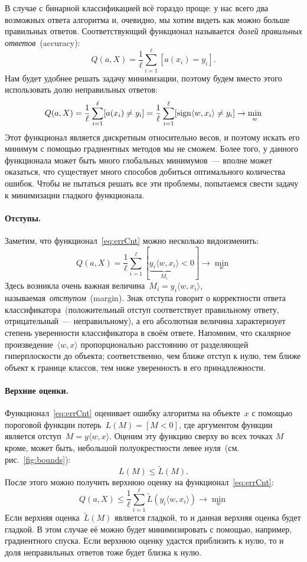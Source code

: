 \documentclass[12pt,fleqn]{article}
\begin{document}
В случае с бинарной классификацией всё гораздо проще: у нас всего два возможных ответа алгоритма и,
очевидно, мы хотим видеть как можно больше правильных ответов.
Соответствующий функционал называется~\emph{долей правильных ответов}~(accuracy):
\[
    Q(a, X)
    =
    \frac{1}{\ell}
    \sum_{i = 1}^{\ell}
        [a(x_i) = y_i].
\]
Нам будет удобнее решать задачу минимизации, поэтому будем вместо этого использовать долю неправильных ответов:
\begin{equation}
\label{eq:errCnt}
    Q(a, X)
    =
    \frac{1}{\ell}
    \sum_{i = 1}^{\ell}
        [a(x_i) \neq y_i]
    =
    \frac{1}{\ell}
    \sum_{i = 1}^{\ell}
        [\mathop{\rm sign}\limits \langle w, x_i \rangle \neq y_i]
    \to
    \min_w
\end{equation}
Этот функционал является дискретным относительно весов, и поэтому искать его минимум
с помощью градиентных методов мы не сможем.
Более того, у данного функционала может быть много глобальных минимумов~---
вполне может оказаться, что существует много способов добиться оптимального количества ошибок.
Чтобы не пытаться решать все эти проблемы, попытаемся свести задачу к минимизации гладкого функционала.

\paragraph{Отступы.}
Заметим, что функционал~\eqref{eq:errCnt} можно несколько видоизменить:
\[
    Q(a, X)
    =
    \frac{1}{\ell}
    \sum_{i = 1}^{\ell}
        [\underbrace{y_i \langle w, x_i \rangle}_{M_i} < 0]
    \to
    \min_w
\]
Здесь возникла очень важная величина~$M_i = y_i \langle w, x_i \rangle$,
называемая~\emph{отступом}~(margin).
Знак отступа говорит о корректности ответа классификатора~(положительный отступ соответствует
правильному ответу, отрицательный~--- неправильному), а его абсолютная величина характеризует
степень уверенности классификатора в своём ответе.
Напомним, что скалярное произведение~$\langle w, x \rangle$ пропорционально расстоянию
от разделяющей гиперплоскости до объекта;
соответственно, чем ближе отступ к нулю, тем ближе объект к границе классов,
тем ниже уверенность в его принадлежности.

\paragraph{Верхние оценки.}
Функционал~\eqref{eq:errCnt} оценивает ошибку алгоритма на объекте~$x$
с помощью пороговой функции потерь~$L(M) = [M < 0]$,
где аргументом функции является отступ~$M = y \langle w, x \rangle$.
Оценим эту функцию сверху во всех точках $M$ кроме, может быть, небольшой полуокрестности левее нуля~(см. рис.~\ref{fig:bounds}):
\[
    L(M) \leq \tilde L(M).
\]
После этого можно получить верхнюю оценку на функционал~\eqref{eq:errCnt}:
\[
    Q(a, X)
    \leq
    \frac{1}{\ell}
    \sum_{i = 1}^{\ell}
        \tilde L(y_i \langle w, x_i \rangle)
    \to
    \min_w
\]
Если верхняя оценка~$\tilde L(M)$ является гладкой, то и данная верхняя оценка будет гладкой.
В этом случае её можно будет минимизировать с помощью, например, градиентного спуска.
Если верхнюю оценку удастся приблизить к нулю, то и доля неправильных ответов тоже будет близка к нулю.
\end{document}
